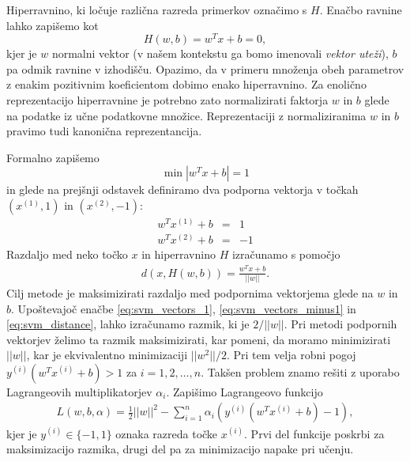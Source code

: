 \documentclass[11pt,a4paper,openany]{book}
\begin{document}
Hiperravnino, ki ločuje različna razreda primerkov označimo s $H$. Enačbo ravnine lahko zapišemo kot
\begin{equation}
  H(w, b) = w^T x + b = 0,
\end{equation}
kjer je $w$ normalni vektor (v našem kontekstu ga bomo imenovali \textit{vektor uteži}), $b$ pa odmik ravnine v izhodišču. Opazimo, da v primeru množenja obeh parametrov z enakim pozitivnim koeficientom dobimo enako hiperravnino. Za enolično reprezentacijo hiperravnine je potrebno zato normalizirati faktorja $w$ in $b$ glede na podatke iz učne podatkovne množice. Reprezentaciji z normaliziranima $w$ in $b$ pravimo tudi kanonična reprezentancija.

Formalno zapišemo
\begin{equation}
	\min |w^T x + b| = 1
\end{equation}
in glede na prejšnji odstavek definiramo dva podporna vektorja v točkah $(x^{(1)}, 1)$ in $(x^{(2)}, -1)$:
\begin{eqnarray}
	w^Tx^{(1)} + b &=& 1 
	\label{eq:svm_vectors_1} \\
	w^Tx^{(2)} + b &=& -1
	\label{eq:svm_vectors_minus1}
\end{eqnarray}
Razdaljo med neko točko $x$ in hiperravnino $H$ izračunamo s pomočjo
\begin{eqnarray}
	d(x, H(w, b)) = \frac{w^Tx + b}{||w||}.
	\label{eq:svm_distance}
\end{eqnarray}
Cilj metode je maksimizirati razdaljo med podpornima vektorjema glede na $w$ in $b$. Upoštevajoč enačbe \ref{eq:svm_vectors_1}, \ref{eq:svm_vectors_minus1} in \ref{eq:svm_distance}, lahko izračunamo razmik, ki je $2 / ||w||$. Pri metodi podpornih vektorjev želimo ta razmik maksimizirati, kar pomeni, da moramo minimizirati $||w||$, kar je ekvivalentno minimizaciji $||w^2||/2$. Pri tem velja robni pogoj $y^{(i)}(w^Tx^{(i)} + b) > 1$ za $i = 1, 2, \ldots, n$. Takšen problem znamo rešiti z uporabo Lagrangeovih multiplikatorjev $\alpha_i$. Zapišimo Lagrangeovo funkcijo
\begin{eqnarray}
	L(w, b, \alpha) = \frac{1}{2}||w||^2 - \sum^n_{i=1} \alpha_i(y^{(i)}(w^Tx^{(i)} + b) - 1),
\end{eqnarray}
kjer je $y^{(i)} \in \{-1, 1\}$ oznaka razreda točke $x^{(i)}$. Prvi del funkcije poskrbi za maksimizacijo razmika, drugi del pa za minimizacijo napake pri učenju.
\end{document}
